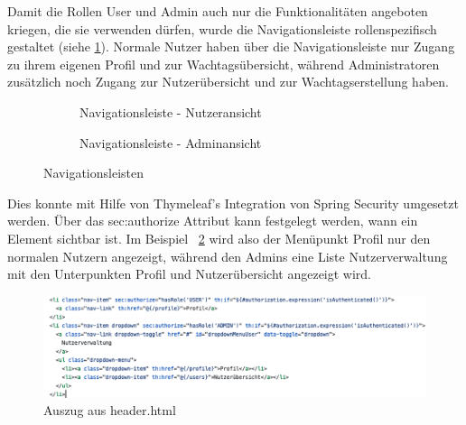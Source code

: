 \documentclass[fontsize=12pt,openright,oneside,paper=a4,BCOR=1cm]{scrbook}
\begin{document}
Damit die Rollen \glqq User\grqq{} und \glqq Admin\grqq{} auch nur die Funktionalit\"aten angeboten kriegen, die sie verwenden d\"urfen, wurde die Navigationsleiste rollenspezifisch gestaltet (siehe \ref{fig:anwendungNavbars}). Normale Nutzer haben \"uber die Navigationsleiste nur Zugang zu ihrem eigenen Profil und zur Wachtags\"ubersicht, w\"ahrend Administratoren zus\"atzlich noch Zugang zur Nutzer\"ubersicht und zur Wachtagserstellung haben.

\begin{figure}[H]
  \centering
  \begin{subfigure}[b]{0.5\linewidth}
    \caption{Navigationsleiste - Nutzeransicht}
  \end{subfigure}
  \begin{subfigure}[b]{0.5\linewidth}
    \caption{Navigationsleiste - Adminansicht}
  \end{subfigure}
  \caption{Navigationsleisten}
  \label{fig:anwendungNavbars}
\end{figure}

Dies konnte mit Hilfe von Thymeleaf's Integration von Spring Security umgesetzt werden. \"Uber das \glqq sec:authorize\grqq{} Attribut kann festgelegt werden, wann ein Element sichtbar ist. Im Beispiel ~\ref{fig:code-navbar} wird also der Men\"upunkt \glqq Profil\grqq{} nur den normalen Nutzern angezeigt, w\"ahrend den Admins eine Liste \glqq Nutzerverwaltung\grqq{} mit den Unterpunkten \glqq Profil\grqq{} und \glqq Nutzer\"ubersicht\grqq{} angezeigt wird.

\begin{figure}[H]
  \centering
    \includegraphics[width=0.7\linewidth]{Anlagen/Code/navbar.png}
    \caption{Auszug aus header.html}
  \label{fig:code-navbar}
\end{figure}
\end{document}
